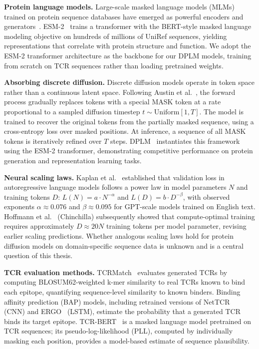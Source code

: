 \documentclass[12pt]{article}
\begin{document}
\textbf{Protein language models.}
Large-scale masked language models (MLMs) trained on protein sequence databases have emerged
as powerful encoders and generators~\cite{lin2023, devlin2019}. ESM-2~\cite{lin2023} trains a
transformer with the BERT-style masked language modeling objective on hundreds of millions of
UniRef sequences, yielding representations that correlate with protein structure and function.
We adopt the ESM-2 transformer architecture as the backbone for our DPLM models, training from
scratch on TCR sequences rather than loading pretrained weights.

\textbf{Absorbing discrete diffusion.}
Discrete diffusion models operate in token space rather than a continuous latent space. Following
Austin et al.~\cite{austin2021}, the forward process gradually replaces tokens with a special
MASK token at a rate proportional to a sampled diffusion timestep $t \sim \text{Uniform}[1, T]$.
The model is trained to recover the original tokens from the partially masked sequence, using a
cross-entropy loss over masked positions. At inference, a sequence of all MASK tokens is
iteratively refined over $T$ steps. DPLM~\cite{wang2024dplm} instantiates this framework using
the ESM-2 transformer, demonstrating competitive performance on protein generation and
representation learning tasks.

\textbf{Neural scaling laws.}
Kaplan et al.~\cite{kaplan2020} established that validation loss in autoregressive language
models follows a power law in model parameters $N$ and training tokens $D$:
$L(N) = a \cdot N^{-\alpha}$ and $L(D) = b \cdot D^{-\beta}$, with observed exponents
$\alpha \approx 0.076$ and $\beta \approx 0.095$ for GPT-scale models trained on English text.
Hoffmann et al.~\cite{hoffmann2022} (Chinchilla) subsequently showed that compute-optimal
training requires approximately $D \approx 20N$ training tokens per model parameter, revising
earlier scaling predictions. Whether analogous scaling laws hold for protein diffusion models
on domain-specific sequence data is unknown and is a central question of this thesis.

\textbf{TCR evaluation methods.}
TCRMatch~\cite{chronister2021} evaluates generated TCRs by computing BLOSUM62-weighted k-mer
similarity to real TCRs known to bind each epitope, quantifying sequence-level similarity to
known binders. Binding affinity prediction (BAP) models, including retrained versions of
NetTCR~\cite{montemurro2022} (CNN) and ERGO~\cite{springer2020} (LSTM), estimate the
probability that a generated TCR binds its target epitope. TCR-BERT~\cite{wu2021tcrbert} is a
masked language model pretrained on TCR sequences; its pseudo-log-likelihood (PLL), computed
by individually masking each position, provides a model-based estimate of sequence plausibility.
\end{document}
